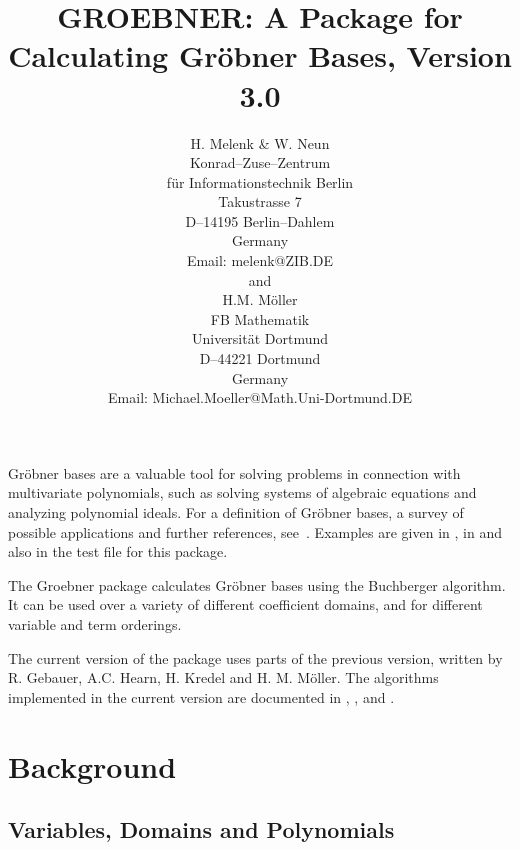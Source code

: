 \title{GROEBNER: A Package for Calculating Gr\"obner Bases, Version 3.0}
\date{}
\author{
H. Melenk \& W. Neun \\[0.05in]
Konrad--Zuse--Zentrum \\
f\"ur Informationstechnik Berlin \\
Takustrasse 7 \\
D--14195 Berlin--Dahlem \\
Germany \\[0.05in]
Email:  melenk@ZIB.DE \\[0.05in]
and \\[0.05in]
H.M. M\"oller \\[0.05in]
FB Mathematik \\
Universit\"at Dortmund \\
D--44221 Dortmund \\
Germany\\[0.05in]
Email: Michael.Moeller@Math.Uni-Dortmund.DE}


\maketitle

Gr\"obner bases are a valuable tool for solving problems in
connection with multivariate polynomials, such as solving systems of
algebraic equations and analyzing polynomial ideals. For a definition
of Gr\"obner bases, a survey of possible applications and further
references, see~\cite{Buchberger:85}. Examples are given in \cite{Boege:86},
in \cite{Buchberger:88} and also in the test file for this package.

 
The Groebner package calculates Gr\"obner bases using the
Buchberger algorithm.  It can be used over a variety of different
coefficient domains, and for different variable and term orderings.

The current version of the package uses parts of the previous
version, written by  R. Gebauer, A.C. Hearn, H. Kredel and H. M.
M\"oller. The algorithms implemented in the current version are
documented in \cite{Faugere:89}, \cite{Gebauer:88},
\cite{Kredel:88a} and \cite{Giovini:91}.

\section{Background}

\subsection{Variables, Domains and Polynomials}


